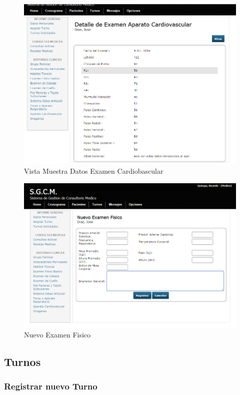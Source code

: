 \begin{figure}[H]
    \centering
    \includegraphics[scale=0.5]{resourse/detalle-cardio.png}
    \caption{Vista Muestra Datos Examen Cardiobascular}
    \label{fig:620}
\end{figure}

\begin{figure}[H]
    \centering
    \includegraphics[scale=0.5]{resourse/nuevo-fisico.png}
    \caption{Nuevo Examen Fisico}
    \label{fig:621}
\end{figure}


\subsection{Turnos}

\subsubsection{Registrar nuevo Turno}

